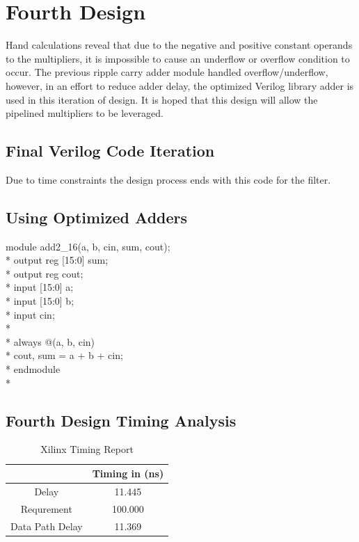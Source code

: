 \section*{Fourth Design}
Hand calculations reveal that due to the negative and positive constant operands to the multipliers, it is impossible to cause an underflow or overflow condition to occur. The previous ripple carry adder module handled overflow/underflow, however, in an effort to reduce adder delay, the optimized Verilog library adder is used in this iteration of design. It is hoped that this design will allow the pipelined multipliers to be leveraged. 
\subsection*{Final Verilog Code Iteration}
Due to time constraints the design process ends with this code for the filter. 

\subsection*{Using Optimized Adders}
module add2\_16(a, b, cin, sum, cout);\\*
  output reg [15:0] sum;\\*
  output reg cout;\\*
  input [15:0] a;\\*
  input [15:0] b;\\*
  input cin;\\*
\\*
  always @(a, b, cin)\\*
    {cout, sum} = a + b + cin;\\*
endmodule\\*


\subsection*{Fourth Design Timing Analysis}

\begin{table}[bh]
\caption{Xilinx Timing Report}
\begin{tabular}{c|c}
\centering
           & Timing in (ns) \\
\hline
     Delay &   11.445  \\

Requrement &    100.000 \\

Data Path Delay & 11.369  \\
\end{tabular}  
\label{tab:timing4}
\end{table}

